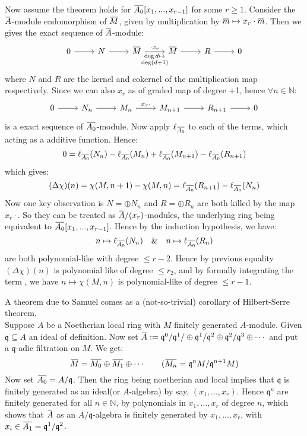 \documentclass[12pt]{article}
\theoremstyle{definition}
\theoremstyle{plain}
\newcommand{\nat}{\mathbb{N}}
\newcommand{\overbar}[1]{\mkern 1.5mu\overline{\mkern-1.5mu#1\mkern-1.5mu}\mkern 1.5mu}
\renewcommand{\bar}{\overbar}
\begin{document}
\medskip
Now assume the theorem holds for $\bar{A_0}[x_1, ..., x_{r-1}]$ for some $r\geq 1$. Consider the $\bar{A}$-module endomorphism of $\bar{M}$, given by multiplication by $\bar{m}\mapsto x_r\cdot \bar{m}$. Then we gives the exact sequence of $\bar{A}$-module:
\begin{equation}
  \begin{tikzcd}
    0\rar &N\rar&\bar{M}\rar{\cdot x_r}[swap]{\substack{{\deg d \mapsto}\\{\deg (d+1)}}}&\bar{M}\rar &R\rar&0
  \end{tikzcd}
\end{equation}
where $N$ and $R$ are the kernel and cokernel of the multiplication map respectively. Since we can also $x_r$ as of graded map of degree +1, hence $\forall n\in \nat$:
\begin{equation}
  \begin{tikzcd}
    0\rar &N_n\rar &M_n \rar{x_r\cdot} &M_{n+1} \rar &R_{n+1} \rar &0
  \end{tikzcd}
\end{equation}
is a exact sequence of $\bar{A_0}$-module. Now apply $\ell_{\bar{A_0}}$ to each of the terms, which acting as a additive function. Hence:
\[0=\ell_{\bar{A_0}}(N_n)-\ell_{\bar{A_0}}(M_n)+\ell_{\bar{A_0}}(M_{n+1})-\ell_{\bar{A_0}}(R_{n+1})\]
which gives:
\[(\Delta \chi)(n)=\chi(M, n+1)-\chi(M, n)=\ell_{\bar{A_0}}(R_{n+1})-\ell_{\bar{A_0}}(N_n)\]
Now one key observation is $N=\oplus N_n$ and $R=\oplus R_n$ are both killed by the map $x_r\cdot$. So they can be treated as $\bar{A}/(x_r)$-modules, the underlying ring being equivalent to $\bar{A_0}[x_1, ..., x_{r-1}]$. Hence by the induction hypothesis, we have:
\[n\mapsto \ell_{\bar{A_0}}(N_n) \quad \& \quad n\mapsto \ell_{\bar{A_0}}(R_n)\]
are both polynomial-like with degree $\leq r-2$. Hence by previous equality $(\Delta\chi)(n)$ is polynomial like of degree $\leq r_2$, and by formally integrating the term , we have $n\mapsto \chi(M, n)$ is polynomial-like of degree $\leq r-1$. \qedhere

\medskip
A theorem due to Samuel comes as a (not-so-trivial) corollary of Hilbert-Serre theorem.\\
\indent Suppose $A$ be a Noetherian local ring with $M$ finitely generated $A$-module. Given $\mathfrak{q}\subseteq A$ an ideal of definition. Now set $\bar{A}:=\mathfrak{q}^0/\mathfrak{q}^1/\oplus \mathfrak{q}^1/\mathfrak{q}^2\oplus \mathfrak{q}^2/\mathfrak{q}^3\oplus\cdots$ and put a $\mathfrak{q}$-adic filtration on $M$. We get:
\[\bar{M}=\bar{M_0}\oplus \bar{M_1}\oplus\cdots \qquad(\bar{M_n}=\mathfrak{q}^nM/\mathfrak{q}^{n+1}M)\]
Now set $\bar{A_0}=A/\mathfrak{q}$. Then the ring being noetherian and local implies that $\mathfrak{q}$ is finitely generated as an ideal(or $A$-algebra) by say, $(x_1, ..., x_r)$. Hence $\mathfrak{q}^n$ are finitely generated for all $n\in \nat$, by polynomials in $x_1, ..., x_r$ of degree $n$, which shows that $\bar{A}$ as an $A/\mathfrak{q}$-algebra is finitely generated by $x_1, ..., x_r$, with $x_i\in \bar{A_1}=\mathfrak{q}^1/\mathfrak{q}^2$.
\end{document}
